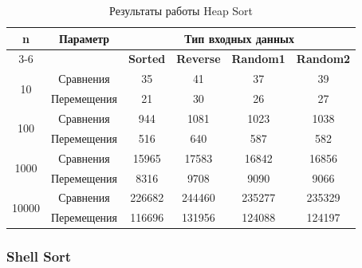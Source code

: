 \documentclass[a4paper,12pt,titlepage]{article}
\begin{document}
\begin{table}[H]
\small
\centering
\begin{tabular}{|c|c|c|c|c|c|}
    \hline
    \multirow{2}{*}{\textbf{n}} & \multirow{2}{*}{\textbf{Параметр}} & \multicolumn{4}{|c|}{\textbf{Тип входных данных}} \\
    \cline{3-6}
    & & \textbf{Sorted} & \textbf{Reverse} & \textbf{Random1} & \textbf{Random2} \\
    \hline
    \multirow{2}{*}{10} & Сравнения & 35 & 41 & 37 & 39 \\
    \cline{2-6}
                        & Перемещения & 21 & 30 & 26 & 27 \\
    \hline
    \multirow{2}{*}{100} & Сравнения & 944 & 1081 & 1023 & 1038 \\
    \cline{2-6}
                         & Перемещения & 516 & 640 & 587 & 582 \\
    \hline
    \multirow{2}{*}{1000} & Сравнения & 15965 & 17583 & 16842 & 16856 \\
    \cline{2-6}
                          & Перемещения & 8316 & 9708 & 9090 & 9066 \\
    \hline
    \multirow{2}{*}{10000} & Сравнения & 226682 & 244460 & 235277 & 235329 \\
    \cline{2-6}
                           & Перемещения & 116696 & 131956 & 124088 & 124197 \\
    \hline
\end{tabular}
\caption{Результаты работы Heap Sort}
\end{table}

\subsubsection{Shell Sort}
\end{document}
